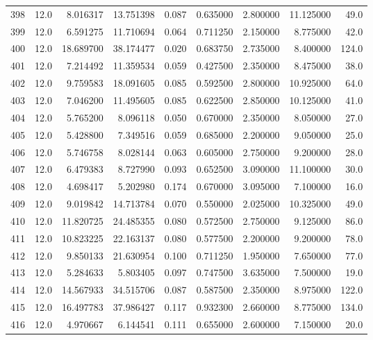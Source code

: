 \begin{tabular}{lrrrrrrrr}
398  &   12.0 &   8.016317 &  13.751398 &  0.087 &  0.635000 &  2.800000 &  11.125000 &   49.0 \\
399  &   12.0 &   6.591275 &  11.710694 &  0.064 &  0.711250 &  2.150000 &   8.775000 &   42.0 \\
400  &   12.0 &  18.689700 &  38.174477 &  0.020 &  0.683750 &  2.735000 &   8.400000 &  124.0 \\
401  &   12.0 &   7.214492 &  11.359534 &  0.059 &  0.427500 &  2.350000 &   8.475000 &   38.0 \\
402  &   12.0 &   9.759583 &  18.091605 &  0.085 &  0.592500 &  2.800000 &  10.925000 &   64.0 \\
403  &   12.0 &   7.046200 &  11.495605 &  0.085 &  0.622500 &  2.850000 &  10.125000 &   41.0 \\
404  &   12.0 &   5.765200 &   8.096118 &  0.050 &  0.670000 &  2.350000 &   8.050000 &   27.0 \\
405  &   12.0 &   5.428800 &   7.349516 &  0.059 &  0.685000 &  2.200000 &   9.050000 &   25.0 \\
406  &   12.0 &   5.746758 &   8.028144 &  0.063 &  0.605000 &  2.750000 &   9.200000 &   28.0 \\
407  &   12.0 &   6.479383 &   8.727990 &  0.093 &  0.652500 &  3.090000 &  11.100000 &   30.0 \\
408  &   12.0 &   4.698417 &   5.202980 &  0.174 &  0.670000 &  3.095000 &   7.100000 &   16.0 \\
409  &   12.0 &   9.019842 &  14.713784 &  0.070 &  0.550000 &  2.025000 &  10.325000 &   49.0 \\
410  &   12.0 &  11.820725 &  24.485355 &  0.080 &  0.572500 &  2.750000 &   9.125000 &   86.0 \\
411  &   12.0 &  10.823225 &  22.163137 &  0.080 &  0.577500 &  2.200000 &   9.200000 &   78.0 \\
412  &   12.0 &   9.850133 &  21.630954 &  0.100 &  0.711250 &  1.950000 &   7.650000 &   77.0 \\
413  &   12.0 &   5.284633 &   5.803405 &  0.097 &  0.747500 &  3.635000 &   7.500000 &   19.0 \\
414  &   12.0 &  14.567933 &  34.515706 &  0.087 &  0.587500 &  2.350000 &   8.975000 &  122.0 \\
415  &   12.0 &  16.497783 &  37.986427 &  0.117 &  0.932300 &  2.660000 &   8.775000 &  134.0 \\
416  &   12.0 &   4.970667 &   6.144541 &  0.111 &  0.655000 &  2.600000 &   7.150000 &   20.0 \\

\end{tabular}
